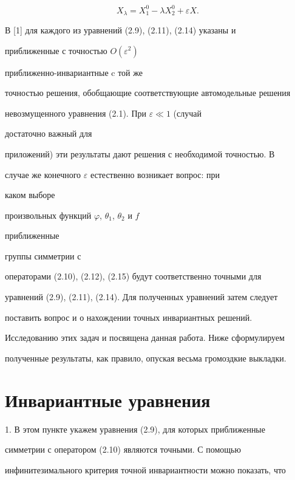 \begin{equation}


X_\lambda=X^0_1-\lambda X^0_2+\varepsilon X.\tag{2.15}


\end{equation}





В [1] для каждого из уравнений (2.9), (2.11), (2.14) указаны и


приближенные с точностью $O(\varepsilon^2)$


приближенно-инвариантные c той же


точностью решения, обобщающие соответствующие автомодельные решения


невозмущенного уравнения (2.1). При $\varepsilon\ll 1$ (случай


достаточно важный для


приложений) эти результаты дают решения с необходимой точностью. В


случае же конечного $\varepsilon$ естественно возникает вопрос: при


каком выборе


произвольных функций $\varphi$, $\theta_1$, $\theta_2$ и $f$


приближенные


группы симметрии с


операторами (2.10), (2.12), (2.15) будут соответственно точными для


уравнений (2.9), (2.11), (2.14). Для полученных уравнений затем следует


поставить вопрос и о нахождении точных инвариантных решений.


Исследованию этих задач и посвящена данная работа. Ниже сформулируем


полученные результаты, как правило, опуская весьма громоздкие выкладки.





\section{Инвариантные уравнения}





1. В этом пункте укажем уравнения (2.9), для которых приближенные


симметрии с оператором (2.10) являются точными. С помощью


инфинитезимального критерия точной инвариантности можно показать, что


